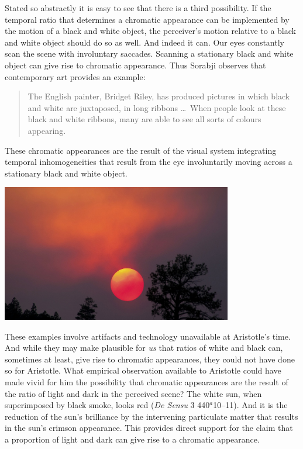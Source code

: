 Stated so abstractly it is easy to see that there is a third possibility. If the temporal ratio that determines a chromatic appearance can be implemented by the motion of a black and white object, the perceiver's motion relative to a black and white object should do so as well. And indeed it can. Our eyes constantly scan the scene with involuntary saccades. Scanning a stationary black and white object can give rise to chromatic appearance. Thus Sorabji observes that contemporary art provides an example:
\begin{quote}
    The English painter, Bridget Riley, has produced pictures in which black and white are juxtaposed, in long ribbons \ldots\ When people look at these black and white ribbons, many are able to see all sorts of colours appearing.
\end{quote}
These chromatic appearances are the result of the visual system integrating temporal inhomogeneities that result from the eye involuntarily moving across a stationary black and white object. \change

\begin{frame}
	\begin{center}
		\includegraphics[height=6cm]{../../graphics/red_sun.jpg}
	\end{center}
\end{frame}

These examples involve artifacts and technology unavailable at Aristotle's time. And while they may make plausible for \emph{us} that ratios of white and black can, sometimes at least, give rise to chromatic appearances, they could not have done so for Aristotle. What empirical observation available to Aristotle could have made vivid for him the possibility that chromatic appearances are the result of the ratio of light and dark in the perceived scene? The white sun, when superimposed by black smoke, looks red (\emph{De Sensu} 3 440\( ^{a} \)10--11). And it is the reduction of the sun's brilliance by the intervening particulate matter that results in the sun's crimson appearance. This provides direct support for the claim that a proportion of light and dark can give rise to a chromatic appearance. \change


